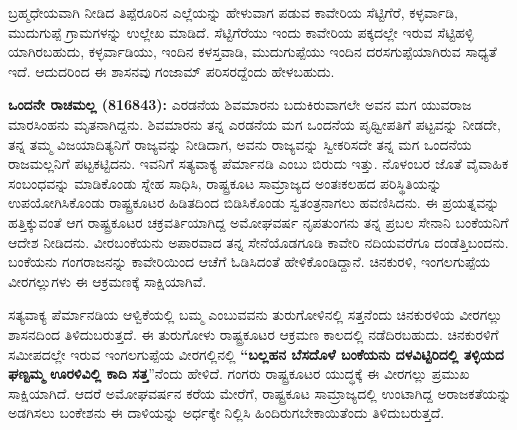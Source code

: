 ಬ್ರಹ್ಮಧೇಯವಾಗಿ ನೀಡಿದ ತಿಪ್ಪೆರೂರಿನ ಎಲ್ಲೆಯನ್ನು ಹೇಳುವಾಗ ಪಡುವ ಕಾವೇರಿಯ ಸೆಟ್ಟಿಗೆರೆ, ಕಳ್ಳರ್ವಾಡಿ, ಮುದುಗುಪ್ಪೆ ಗ್ರಾಮಗಳನ್ನು ಉಲ್ಲೇಖ ಮಾಡಿದೆ. ಸೆಟ್ಟಿಗೆರೆಯು ಇಂದು ಕಾವೇರಿಯ ಪಕ್ಕದಲ್ಲೇ ಇರುವ ಸೆಟ್ಟಿಹಳ್ಳಿ ಯಾಗಿರಬಹುದು, ಕಳ್ಳರ್ವಾಡಿಯು, ಇಂದಿನ ಕಳಸ್ತವಾಡಿ, ಮುದುಗುಪ್ಪೆಯು ಇಂದಿನ ದರಸಗುಪ್ಪೆಯಾಗಿರುವ ಸಾಧ್ಯತೆ ಇದೆ. ಆದುದರಿಂದ ಈ ಶಾಸನವು ಗಂಜಾಮ್ ಪರಿಸರದ್ದೆಂದು ಹೇಳಬಹುದು.

\textbf{ಒಂದನೇ ರಾಚಮಲ್ಲ (816\general{\enginline{-}}843):} ಎರಡನೆಯ ಶಿವಮಾರನು ಬದುಕಿರುವಾಗಲೇ ಅವನ ಮಗ ಯುವರಾಜ ಮಾರಸಿಂಹನು ಮೃತನಾಗಿದ್ದನು. ಶಿವಮಾರನು ತನ್ನ ಎರಡನೆಯ ಮಗ ಒಂದನೆಯ ಪೃಥ್ವೀಪತಿಗೆ ಪಟ್ಟವನ್ನು ನೀಡದೇ, ತನ್ನ ತಮ್ಮ ವಿಜಯಾದಿತ್ಯನಿಗೆ ರಾಜ್ಯವನ್ನು ನೀಡಿದಾಗ, ಅವನು ರಾಜ್ಯವನ್ನು ಸ್ವೀಕರಿಸದೇ ತನ್ನ ಮಗ ಒಂದನೆಯ ರಾಜಮಲ್ಲನಿಗೆ ಪಟ್ಟಕಟ್ಟಿದನು. ಇವನಿಗೆ ಸತ್ಯವಾಕ್ಯ ಪೆರ್ಮಾನಡಿ ಎಂಬು ಬಿರುದು ಇತ್ತು. ನೊಳಂಬರ ಜೊತೆ ವೈವಾಹಿಕ ಸಂಬಂಧವನ್ನು ಮಾಡಿಕೊಂಡು ಸ್ನೇಹ ಸಾಧಿಸಿ, ರಾಷ್ಟ್ರಕೂಟ ಸಾಮ್ರಾಜ್ಯದ ಅಂತಃಕಲಹದ ಪರಿಸ್ಥಿತಿಯನ್ನು ಉಪಯೋಗಿಸಿಕೊಂಡು ರಾಷ್ಟ್ರಕೂಟರ ಹಿಡಿತದಿಂದ ಬಿಡಿಸಿಕೊಂಡು ಸ್ವತಂತ್ರನಾಗಲು ಹವಣಿಸಿದನು. ಈ ಪ್ರಯತ್ನವನ್ನು ಹತ್ತಿಕ್ಕುವಂತೆ ಆಗ ರಾಷ್ಟ್ರಕೂಟರ ಚಕ್ರವರ್ತಿಯಾಗಿದ್ದ ಅಮೋಘವರ್ಷ ನೃಪತುಂಗನು ತನ್ನ ಪ್ರಬಲ ಸೇನಾನಿ ಬಂಕೆಯನಿಗೆ ಆದೇಶ ನೀಡಿದನು. ವೀರಬಂಕೆಯನು ಅಪಾರವಾದ ತನ್ನ ಸೇನೆಯೊಡಗೂಡಿ ಕಾವೇರಿ ನದಿಯವರೆಗೂ ದಂಡೆತ್ತಿಬಂದನು. ಬಂಕೆಯನು ಗಂಗರಾಜನನ್ನು ಕಾವೇರಿಯಿಂದ ಆಚೆಗೆ ಓಡಿಸಿದಂತೆ ಹೇಳಿಕೊಂಡಿದ್ದಾನೆ. ಚಿನಕುರಳಿ, ಇಂಗಲಗುಪ್ಪೆಯ ವೀರಗಲ್ಲುಗಳು ಈ ಆಕ್ರಮಣಕ್ಕೆ ಸಾಕ್ಷಿಯಾಗಿವೆ.

ಸತ್ಯವಾಕ್ಯ ಪೆರ್ಮಾನಡಿಯ ಆಳ್ವಿಕೆಯಲ್ಲಿ ಬಮ್ಮ ಎಂಬುವವನು ತುರುಗೋಳಿನಲ್ಲಿ ಸತ್ತನೆಂದು ಚಿನಕುರಳಿಯ ವೀರಗಲ್ಲು ಶಾಸನದಿಂದ ತಿಳಿದುಬರುತ್ತದೆ. ಈ ತುರುಗೋಳು ರಾಷ್ಟ್ರಕೂಟರ ಆಕ್ರಮಣ ಕಾಲದಲ್ಲಿ ನಡೆದಿರಬಹುದು. ಚಿನಕುರಳಿಗೆ ಸಮೀಪದಲ್ಲೇ ಇರುವ ಇಂಗಲಗುಪ್ಪೆಯ ವೀರಗಲ್ಲಿನಲ್ಲಿ \textbf{“ಬಲ್ಲಹನ ಬೆಸದೊಳೆ ಬಂಕೆಯನು ದಳವಿಟ್ಟಿರಿದಲ್ಲಿ ತಳ್ಳಿಯದ ಘಣ್ಟಮ್ಮ ಊರಳಿವಿಲ್ಲಿ ಕಾದಿ ಸತ್ತ}”ನೆಂದು ಹೇಳಿದೆ. ಗಂಗರು ರಾಷ್ಟ್ರಕೂಟರ ಯುದ್ಧಕ್ಕೆ ಈ ವೀರಗಲ್ಲು ಪ್ರಮುಖ ಸಾಕ್ಷಿಯಾಗಿದೆ. ಆದರೆ ಅಮೋಘವರ್ಷನ ಕರೆಯ ಮೇರೆಗೆ, ರಾಷ್ಟ್ರಕೂಟ ಸಾಮ್ರಾಜ್ಯದಲ್ಲಿ ಉಂಟಾಗಿದ್ದ ಅರಾಜಕತೆಯನ್ನು ಅಡಗಿಸಲು ಬಂಕೇಶನು ಈ ದಾಳಿಯನ್ನು ಅರ್ಧಕ್ಕೇ ನಿಲ್ಲಿಸಿ ಹಿಂದಿರುಗಬೇಕಾಯಿತೆಂದು ತಿಳಿದುಬರುತ್ತದೆ.

